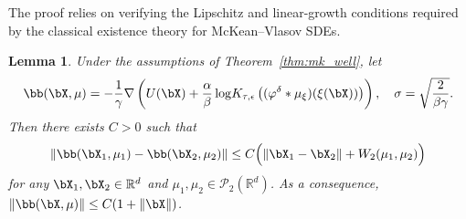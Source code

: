 \documentclass[a4paper,fleqn]{cas-sc}
\newtheorem{lemma}[theorem]{Lemma}
\theoremstyle{definition}
\begin{document}
The proof relies on verifying the Lipschitz and linear-growth conditions required by the classical existence theory for McKean--Vlasov SDEs.


\begin{lemma} \label{lem:lip_cont}
Under the assumptions of Theorem~\ref{thm:mk_well},
let 
\begin{equation}
\bb(\bX,\mu)
=
-\frac{1}{\gamma}\nabla \left( U(\bX)
+
\frac{\alpha}{\beta}
\log\!
K_{\tau,\epsilon}\left((\varphi^\delta * \mu_{\xi})(\xi(\bX))\right)
\right), \quad \sigma = \sqrt{\frac{2}{\beta\gamma}}.
\label{eq:b_drift}
\end{equation}
Then there exists $C>0$ such that
\begin{equation}\label{equ:lip}
   \|\bb(\bX_1,\mu_1)-\bb(\bX_2,\mu_2)\|
\le
C\Big(\|\bX_1-\bX_2\|+W_2(\mu_1,\mu_2)\Big) 
\end{equation}
for any $\bX_1,\bX_2\in \mathbb R^{d}$ and $\mu_1,\mu_2\in \mathcal P_2(\mathbb{R}^{d})$.
As a consequence, $\|\bb(\bX,\mu)\| \leq C(1+\|\bX\|)$.
\end{lemma}
\end{document}
